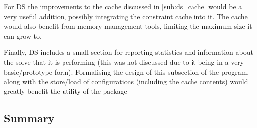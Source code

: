 For \ac{DS} the improvements to the cache discussed in \ref{sub:ds_cache} would be a very useful addition, possibly integrating the constraint cache into it. The cache would also benefit from memory management tools, limiting the maximum size it can grow to.

Finally, \ac{DS} includes a small section for reporting statistics and information about the solve that it is performing (this was not discussed due to it being in a very basic/prototype form). Formalising the design of this subsection of the program, along with the store/load of configurations (including the cache contents) would greatly benefit the utility of the package.

\subsection{Summary}